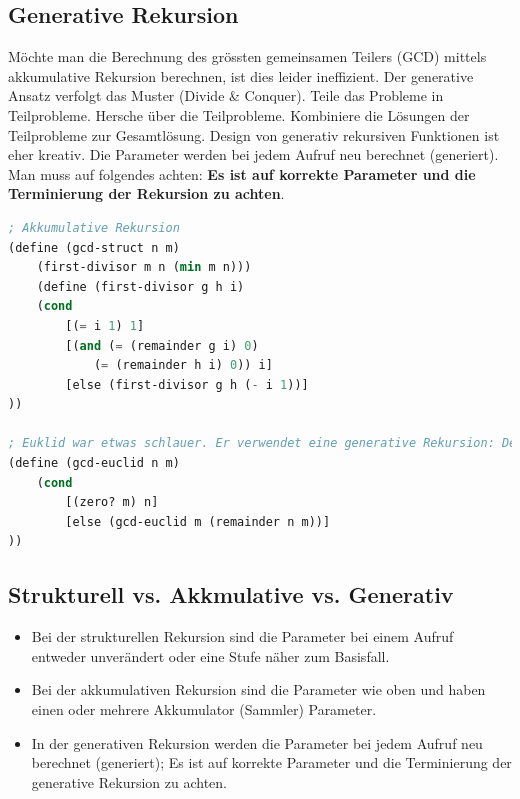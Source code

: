 \subsection{Generative Rekursion}
Möchte man die Berechnung des grössten gemeinsamen Teilers (GCD) mittels akkumulative Rekursion berechnen, ist dies leider ineffizient. Der generative Ansatz verfolgt das Muster (Divide \& Conquer). Teile das Probleme in Teilprobleme. Hersche über die Teilprobleme. Kombiniere die Lösungen der Teilprobleme zur Gesamtlösung. Design von generativ rekursiven Funktionen ist eher kreativ. Die Parameter werden bei jedem Aufruf neu berechnet (generiert). Man muss auf folgendes achten: \textbf{Es ist auf korrekte Parameter und die Terminierung der Rekursion zu achten}.

\begin{lstlisting}[language=Lisp, caption=Generative Rekursion - Beispiel GCD]
; Akkumulative Rekursion
(define (gcd-struct n m)
	(first-divisor m n (min m n)))
	(define (first-divisor g h i)
	(cond
		[(= i 1) 1]
		[(and (= (remainder g i) 0)
			(= (remainder h i) 0)) i]
		[else (first-divisor g h (- i 1))]
))

; Euklid war etwas schlauer. Er verwendet eine generative Rekursion: Der trivial lösbare Fall ist m=0. Und der generative Schritt gcd-euclid mit n und (remainder n m) als Argumente. Die Argumente basieren auf keinem rekurisven Datentypen. Die Argumente werden bei jedem Aufruf neu berechnet.
(define (gcd-euclid n m)
	(cond
		[(zero? m) n]
		[else (gcd-euclid m (remainder n m))]
))
\end{lstlisting}

\subsection{Strukturell vs. Akkmulative vs. Generativ}

\begin{itemize}
	\item Bei der strukturellen Rekursion sind die Parameter bei einem Aufruf entweder unverändert oder eine Stufe näher zum Basisfall.
	\item Bei der akkumulativen Rekursion sind die Parameter wie oben und haben einen oder mehrere Akkumulator (Sammler) Parameter.
	\item In der generativen Rekursion werden die Parameter bei jedem Aufruf neu berechnet (generiert); Es ist auf  korrekte Parameter und die Terminierung der generative Rekursion zu achten.
\end{itemize}

